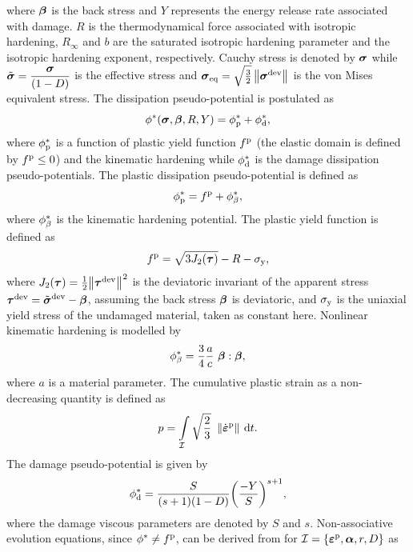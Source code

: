 where $\mbox{$\bm \beta$}$ is the back stress and $Y$ represents the energy release rate associated with damage. $R$ is the thermodynamical force associated with isotropic
hardening, $R_\infty$ and $b$ are the saturated isotropic hardening parameter and the isotropic hardening exponent, respectively. Cauchy stress is denoted by $\mbox{$\bm \sigma$}$ while ${\tilde{\mbox{$\bm \sigma$}}} = \displaystyle \frac{\mbox{$\bm \sigma$}}{(1-D)} $ is the effective stress and $\mbox{$\bm \sigma$}_{\rm eq} = \sqrt{\frac{3}{2}} \left\lVert \mbox{$\bm \sigma$}^{\rm dev} \right\rVert_{}$ is the von Mises equivalent stress. The dissipation pseudo-potential is postulated as
\begin{equation}
	\phi^\ast(\mbox{$\bm \sigma$},\mbox{$\bm \beta$},R,Y)= \phi^{\ast}_{\rm p} + \phi^{\ast}_{\rm d} ,
	\label{eq:dissipation}
\end{equation}
where $\phi^{\ast}_{\rm p}$ is a function of plastic yield function $f^{\rm p}$ (the elastic domain is defined by $f^{\rm p} \leq 0$) and the kinematic hardening while $\phi^{\ast}_{\rm d}$ is the damage dissipation pseudo-potentials. The plastic dissipation pseudo-potential is defined as
\begin{equation}
	\phi^{\ast}_{\rm p} = f^{\rm p} + \phi^{\ast}_{\beta},
\end{equation}
where $\phi^{\ast}_{\beta}$ is the kinematic hardening potential. The plastic yield function is defined as
\begin{equation}
	f^{\rm p}= \sqrt{3 J_{2}(\mbox{$\bm \tau$}) } - R - \sigma_{\rm y},
	\label{eq_yield_func}
\end{equation}
where $  J_{2}(\mbox{$\bm \tau$}) = \frac{1}{2} {\left\lVert \mbox{$\bm \tau$}^{\rm dev} \right\rVert_{}}^2$ is the deviatoric invariant of the apparent stress ${\mbox{$\bm \tau$}^{\rm dev}= {{\tilde{\mbox{$\bm \sigma$}}}}^{\rm dev} - \mbox{$\bm \beta$}}$, assuming the back stress $\mbox{$\bm \beta$}$ is deviatoric, and $\sigma_{\rm y}$ is the uniaxial yield stress of the undamaged material, taken as constant here. Nonlinear kinematic hardening is modelled by
\begin{equation}
	\phi^{\ast}_{\beta} = \frac{3}{4} \frac{a}{c} \  \mbox{$\bm \beta$}:\mbox{$\bm \beta$},
\end{equation}
where $a$ is a material parameter. The cumulative plastic strain as a non-decreasing quantity is defined as
\begin{equation}
	p = \int \displaylimits_{{\cal I}} \sqrt{\frac{2}{3}} \  \left\lVert \dot{\mbox{$\bm \varepsilon $}}^{\rm p} \right\rVert_{}  {\,\rm d} t.
\end{equation}
The damage pseudo-potential is given by \parencite{lemaitre2005engineering}
\begin{equation}
	\phi^{\ast}_{\rm d} = \frac{S}{(s+1)(1-D)}  {\left( \frac{-Y}{S} \right)}^{s+1},
\end{equation}
where the damage viscous parameters are denoted by $S$ and $s$. Non-associative evolution equations, since $\phi^\ast \neq f^{\rm p}$, can be derived from  for ${\cal I}=\{\mbox{$\bm \varepsilon $}^{\rm{p}},\mbox{$\bm \alpha$},r,D\}$ as
